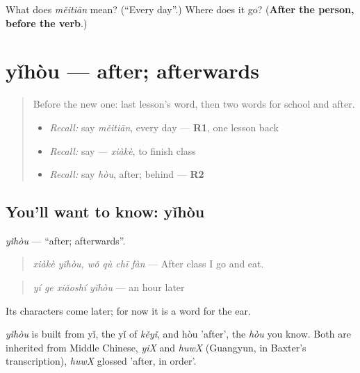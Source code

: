 \begin{tcolorbox}[breakable,colback=teal!4,colframe=teal!35!black,title={Before you move on}]
What does \emph{měitiān} mean? (\textquotedblleft{}Every day\textquotedblright{}.) Where does it go? (\textbf{After the person, before the verb}.)
\end{tcolorbox}
\section[yǐhòu]{yǐhòu — after; afterwards}

\label{lesson:ZH-C97-yihou}



\begin{quote}
Before the new one: last lesson's word, then two words for school and after.

\begin{itemize}
\raggedright
  \item \emph{Recall:} say \emph{měitiān}, every day — \textbf{R1}, one lesson back
  \item \emph{Recall:} say  — \emph{xiàkè}, to finish class
  \item \emph{Recall:} say \emph{hòu}, after; behind — \textbf{R2}
\end{itemize}
\end{quote}

\subsection*{You'll want to know: yǐhòu}
\emph{yǐhòu} — \textquotedblleft{}after; afterwards\textquotedblright{}.

\begin{quote}
\emph{xiàkè yǐhòu, wǒ qù chī fàn} — After class I go and eat.
\end{quote}

\begin{quote}
\emph{yí ge xiǎoshí yǐhòu} — an hour later
\end{quote}

Its characters come later; for now it is a word for the ear.

\begin{cousinweb}
\emph{yǐhòu} is built from yǐ, the yǐ of \emph{kěyǐ}, and hòu 'after', the \emph{hòu} you know. Both are inherited from Middle Chinese, \emph{yiX} and \emph{huwX} (Guangyun, in Baxter's transcription), \emph{huwX} glossed 'after, in order'.
\end{cousinweb}

